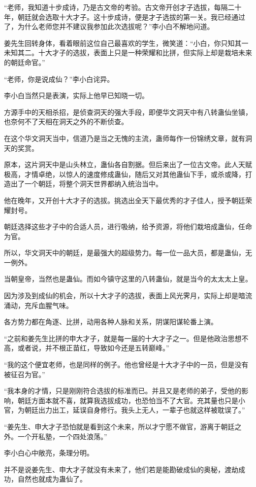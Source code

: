 \begin{this_body}
“老师，我知道十步成诗，乃是古文帝的考验。古文帝开创才子选拔，每隔二十年，朝廷就会选取十大才子。这十步成诗，便是才子选拔的第一关。我已经通过了，为什么老师您并不建议我参加此次选拔呢？”李小白不解地问道。

姜先生回转身体，看着眼前这位自己最喜欢的学生，微笑道：“小白，你只知其一未知其二。十大才子的选拔，表面上只是一种荣耀和比拼，但实际上却是栽培未来的朝廷命官。”

“老师，你是说成仙？”李小白诧异。

李小白当然只是表演，实际上他早已知晓一切。

方源手中的天相杀招，是侦查洞天的强大手段，即便华文洞天中有八转蛊仙坐镇，也奈何不了天相在洞天之外的不断侦查。

在这个华文洞天当中，信道乃是当之无愧的主流，蛊师每作一份锦绣文章，就有洞天的奖赏。

原本，这片洞天中是山头林立，蛊仙各自割据。但后来出了一位古文帝。此人天赋极高，才情卓绝，以惊人的速度修成蛊仙，随后又对其他蛊仙下手，或杀或降，打造出了一个朝廷，将整个洞天世界都纳入统治当中。

他在晚年，又开创十大才子的选拔。挑选出全天下最优秀的才子佳人，授予朝廷荣耀封号。

朝廷选择这些才子中的合适人员，进行吸纳，给予资源，将他们栽培成蛊仙，任命为官。

所以，华文洞天中的朝廷，是最强大的超级势力。每一位一品大员，都是蛊仙，无一例外。

当朝皇帝，当然也是蛊仙。而如今镇守这里的八转蛊仙，就是当今的太太太上皇。

因为涉及到成仙的机会，所以十大才子的选拔，表面上风光霁月，实际上却是暗流涌动，充斥血腥气味。

各方势力都在角逐、比拼，动用各种人脉和关系，阴谋阳谋轮番上演。

“之前和姜先生比拼的申大才子，就是每一届的十大才子之一。但是他政治思想不高，或者说，并不根正苗红，导致如今还是五转巅峰。”

“我的这个便宜老师，也是同样的例子。他也曾经是十大才子中的一员，但是没有被征召为官。”

“我本身的才情，只是刚刚符合选拔的标准而已。并且又是老师的弟子，受他的影响，朝廷方面本就不喜，就算我选拔成功，也恐怕当不了大官。充其量也只是小官，为朝廷出力出工，延误自身修行。我头上无人，一辈子也就这样被耽误了。”

“姜先生、申大才子恐怕就是看到这个未来，所以才宁愿不做官，游离于朝廷之外。一个开私塾，一个四处浪荡。”

李小白心中敞亮，条理分明。

并不是说姜先生、申大才子就没有未来了，他们若是能勘破成仙的奥秘，渡劫成功，自然也就成为蛊仙了。


\end{this_body}
